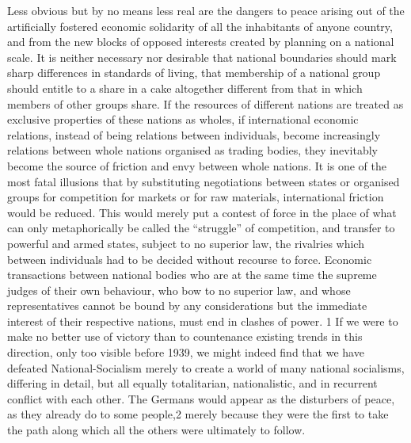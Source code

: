 \documentclass[11pt,openany]{book}
\begin{document}
Less obvious but by no means less real are the dangers to peace arising out of the artificially fostered economic solidarity of all the inhabitants of anyone country, and from the new blocks of opposed interests created by planning on a national scale. It is neither necessary nor desirable that national boundaries should mark sharp differences in standards of living, that membership of a national group should entitle to a share in a cake altogether different from that in which members of other groups share. If the resources of different nations are treated as exclusive properties of these nations as wholes, if international economic relations, instead of being relations between individuals, become increasingly relations between whole nations organised as trading bodies, they inevitably become the source of friction and envy between whole nations. It is one of the most fatal illusions that by substituting negotiations between states or organised groups for competition for markets or for raw materials, international friction would be reduced. This would merely put a contest of force in the place of what can only metaphorically be called the ``struggle'' of competition, and transfer to powerful and armed states, subject to no superior law, the rivalries which between individuals had to be decided without recourse to force. Economic transactions between national bodies who are at the same time the supreme judges of their own behaviour, who bow to no superior law, and whose representatives cannot be bound by any considerations but the immediate interest of their respective nations, must end in clashes of power. 1 If we were to make no better use of victory than to countenance existing trends in this direction, only too visible before 1939, we might indeed find that we have defeated National-Socialism merely to create a world of many national socialisms, differing in detail, but all equally totalitarian, nationalistic, and in recurrent conflict with each other. The Germans would appear as the disturbers of peace, as they already do to some people,2 merely because they were the first to take the path along which all the others were ultimately to follow.

\begin{center}\textasteriskcentered\hspace{0.9em}\textasteriskcentered\hspace{0.9em}\textasteriskcentered\end{center}

\begin{center}\textasteriskcentered\hspace{0.9em}\textasteriskcentered\hspace{0.9em}\textasteriskcentered\end{center}
\end{document}

